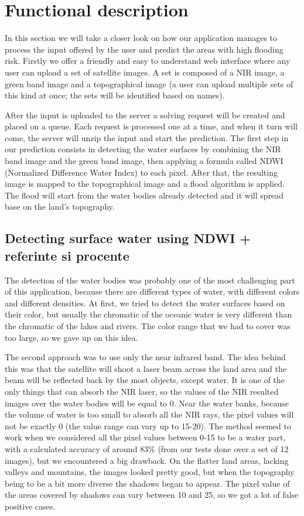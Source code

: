 \documentclass[12pt, a4paper]{report}
\begin{document}
\section{Functional description}

\quad
In this section we will take a closer look on how our application manages to process the input offered by the user and predict the areas with high flooding risk. Firstly we offer a friendly and easy to understand web interface where any user can upload a set of satellite images. A set is composed of a NIR image, a green band image and a topographical image (a user can upload multiple sets of this kind at once; the sets will be identified based on names).
\par 
 After the input is uploaded to the server a solving request will be created and placed on a queue. Each request is processed one at a time, and when it turn will come, the server will unzip the input and start the prediction. The first step in our prediction consists in detecting the water surfaces by combining the NIR band image and the green band image, then applying a formula called NDWI (Normalized Difference Water Index) to each pixel. After that, the resulting image is mapped to the topographical image and a flood algorithm is applied. The flood will start from the water bodies already detected and it will spread base on the land's topography.

\newpage
\subsection{Detecting surface water using NDWI + referinte si procente}
\quad 

The detection of the water bodies was probably one of the most challenging part of this application, because there are different types of water, with different colors and different densities. At first, we tried to detect the water surfaces based on their color, but usually the chromatic of the oceanic water is very different than the chromatic of the lakes and rivers. The color range that we had to cover was too large, so we gave up on this idea. 
\par 
The second approach was to use only the near infrared band. The idea behind this was that the satellite will shoot a laser beam across the land area and the beam will be reflected back by the most objects, except water. It is one of the only things that can absorb the NIR laser, so the values of the NIR resulted images over the water bodies will be equal to 0. Near the water banks, because the volume of water is too small to absorb all the NIR rays, the pixel values will not be exactly 0 (the value range can vary up to 15-20). The method seemed to work when we considered all the pixel values between 0-15 to be a water part, with a calculated accuracy of around 83\% (from our tests done over a set of 12 images), but we encountered a big drawback. On the flatter land areas, lacking valleys and mountains, the images looked pretty good, but when the topography being to be a bit more diverse the shadows began to appear. The pixel value of the areas covered by shadows can vary between 10 and 25, so we got a lot of false positive cases.
\end{document}

